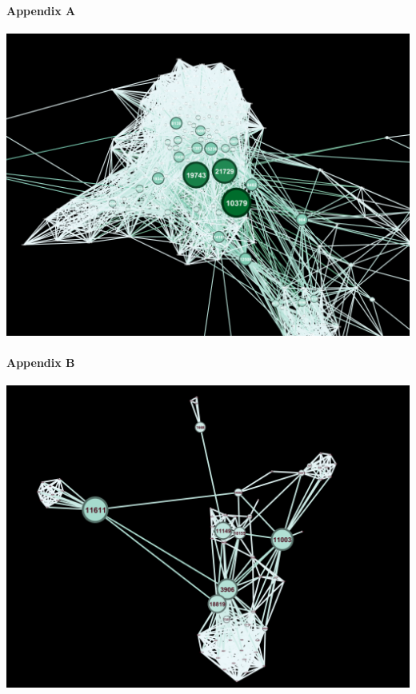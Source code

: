 \documentclass[11pt,twocolumn]{article}
\begin{document}
\newpage

\appendixpage
\paragraph{Appendix A\newline\newline}
\includegraphics[scale=0.22]{betweennesscentraility_gov.png}
\paragraph{Appendix B\newline\newline}
\includegraphics[scale=0.22]{betweennesscentraility_politician.png}
\newline
\end{document}

